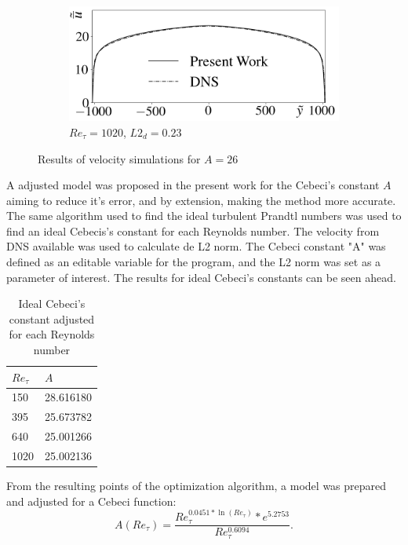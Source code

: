 \documentclass[10pt]{article} %
\begin{document}
\begin{figure}[!h]
	\begin{subfigure}[t]{0.45\textwidth}
		\centering
		\includegraphics[angle=0, scale=0.24]{fotos_formatacao_final/Temperature_1000_Avelocity}
		\caption{$Re_\tau = 1020$, $L2_d = 0.23$}
	\end{subfigure}	
	\caption{Results of velocity simulations for $A = 26$}
	\label{figura_10}
\end{figure}

\newpage

A adjusted model was proposed in the present work for the Cebeci's constant $A$ aiming to reduce it's error, and by extension, making the method more accurate. The same algorithm used to find the ideal turbulent Prandtl numbers was used to find an ideal Cebecis's constant for each Reynolds number. The velocity from DNS available was used to calculate de L2 norm. The Cebeci constant "A" was defined as an editable variable for the program, and the L2 norm was set as a parameter of interest. The results for ideal Cebeci's constants can be seen ahead.

\begin{table}[!h]
	\centering
	\caption{Ideal Cebeci's constant adjusted for each Reynolds number}
	\begin{tabular}{ll}
		\hline
		$Re_\tau$ & $A$\\
		\hline
		150  &   28.616180\\
		395  &   25.673782\\
		640  &   25.001266\\
		1020 &   25.002136\\ 
		\hline
	\end{tabular}
	\label{tablea}
\end{table}

 From the resulting points of the optimization algorithm, a model was prepared and adjusted for a Cebeci function:
\begin{equation}
A \left( Re_\tau\right)= \frac{Re_\tau ^{0.0451 * \ln(Re_\tau)} *e ^ {5.2753} }{Re_\tau ^{0.6094}}.
\end{equation}
\end{document}
